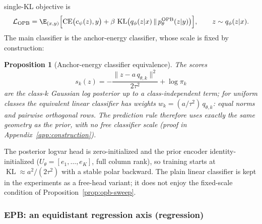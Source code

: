 \documentclass{article} %
\theoremstyle{plain}
\newtheorem{proposition}{Proposition}[section]
\theoremstyle{remark}
\renewcommand{\KL}{\operatorname{KL}}
\DeclareMathOperator{\CE}{CE}
\begin{document}
single-KL objective is
\begin{equation}
\mathcal{L}_{\mathrm{OPB}}
= \E_{(x,y)}\Bigl[
\CE\bigl(c_\psi(z), y\bigr)
+ \beta\, \KL\bigl(q_\phi(z|x) \,\|\, p_\theta^{\mathrm{OPB}}(z|y)\bigr)
\Bigr],
\qquad z \sim q_\phi(z|x) .
\label{eq:opb-objective}
\end{equation}
The main classifier is the anchor-energy classifier, whose scale is fixed by
construction:
\begin{proposition}[Anchor-energy classifier equivalence]
\label{prop:opb-energy}
The scores
\begin{equation}
s_k(z) = -\frac{\|z - a\,q_{\theta,k}\|^2}{2\tau^2} + \log \pi_k
\label{eq:opb-energy}
\end{equation}
are the class-$k$ Gaussian log posterior up to a class-independent term; for uniform
classes the equivalent linear classifier has weights $w_k = (a/\tau^2)\,q_{\theta,k}$:
equal norms and pairwise orthogonal rows. The prediction rule therefore uses
exactly the same geometry as the prior, with no free classifier scale (proof in
Appendix~\ref{app:construction}).
\end{proposition}
The posterior logvar head is zero-initialized and the prior encoder
identity-initialized ($U_\theta = [e_1,\dots,e_K]$, full column rank), so training
starts at $\KL \approx a^2/(2\tau^2)$ with a stable polar backward. The plain linear
classifier is kept in the experiments as a free-head variant; it does not enjoy the
fixed-scale condition of Proposition~\ref{prop:opb-sweep}.

\subsubsection{EPB: an equidistant regression axis (regression)}
\label{sec:epb}
\end{document}
